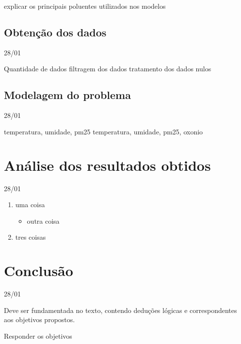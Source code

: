 \documentclass[
  12pt,		%
  a4paper,	%
  openright,%
  oneside,	%
  chapter=TITLE,		%
  section=TITLE,		%
  english,	%
  french,	%
  spanish,	%
  brazil	%
]{abntex2}
\begin{document}
    explicar os principais poluentes utilizados nos modelos
    \section{Obtenção dos dados}
    28/01

    Quantidade de dados
    filtragem dos dados
    tratamento dos dados nulos
    \section{Modelagem do problema}
    28/01

    temperatura, umidade, pm25
    temperatura, umidade, pm25, oxonio
    \chapter{Análise dos resultados obtidos}
    28/01


    
        

        \begin{enumerate}
            \item uma coisa
            \begin{itemize}
                \item outra coisa
            \end{itemize}
            \item tres coisas
        \end{enumerate}

    \chapter{Conclusão}
    28/01
    
        Deve ser fundamentada no texto, contendo deduções lógicas e correspondentes aos objetivos propostos.
        
        Responder os objetivos
    
    \postextual
    
\end{document}
